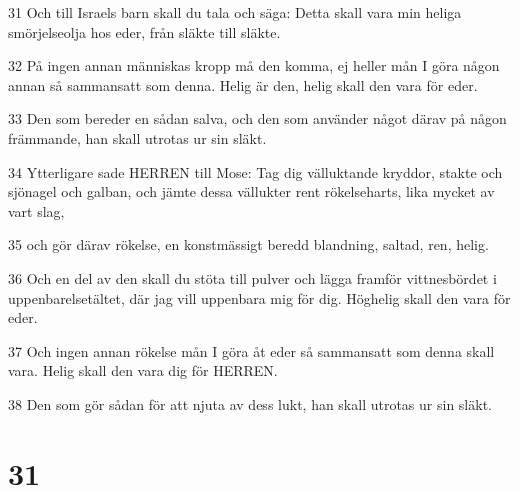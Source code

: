 \par 31 Och till Israels barn skall du tala och säga: Detta skall vara min heliga smörjelseolja hos eder, från släkte till släkte.
\par 32 På ingen annan människas kropp må den komma, ej heller mån I göra någon annan så sammansatt som denna. Helig är den, helig skall den vara för eder.
\par 33 Den som bereder en sådan salva, och den som använder något därav på någon främmande, han skall utrotas ur sin släkt.
\par 34 Ytterligare sade HERREN till Mose: Tag dig välluktande kryddor, stakte och sjönagel och galban, och jämte dessa vällukter rent rökelseharts, lika mycket av vart slag,
\par 35 och gör därav rökelse, en konstmässigt beredd blandning, saltad, ren, helig.
\par 36 Och en del av den skall du stöta till pulver och lägga framför vittnesbördet i uppenbarelsetältet, där jag vill uppenbara mig för dig. Höghelig skall den vara för eder.
\par 37 Och ingen annan rökelse mån I göra åt eder så sammansatt som denna skall vara. Helig skall den vara dig för HERREN.
\par 38 Den som gör sådan för att njuta av dess lukt, han skall utrotas ur sin släkt.

\chapter{31}

